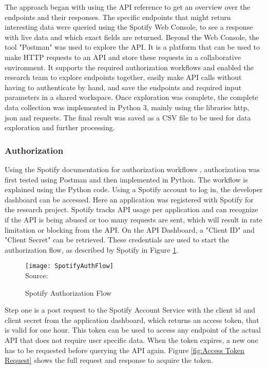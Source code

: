 The approach began with using the \ac{API} reference to get an overview over the endpoints and their responses.
The specific endpoints that might return interesting data were queried using the Spotify Web Console, to see
a response with live data and which exact fields are returned.
Beyond the Web Console, the tool "Postman" was used to explore the \ac{API}.
It is a platform that can be used to make HTTP requests to an API and store these requests in
a collaborative environment. \cite{PostmanWhatIs} It supports the required authorization workflows
and enabled the research team to explore endpoints together, easily make \ac{API} calls without having to
authenticate by hand, and save the endpoints and required input parameters in a shared workspace.
Once exploration was complete, the complete data collection was implemented in Python 3, mainly using the
libraries http, json and requests. The final result was saved as a CSV file to be used for data exploration
and further processing.

\subsubsection{Authorization}

Using the Spotify documentation for authorization workflows \cite{SpotifyAuth}, authorization was first tested
using Postman and then implemented in Python.
The workflow is explained using the Python code.
Using a Spotify account to log in, the developer dashboard can be accessed. Here an application was registered with
Spotify for the research project. Spotify tracks \ac{API} usage per application and can recognize if the API is
being abused or too many requests are sent, which will result in rate limitation or blocking from the \ac{API}.
On the API Dashboard, a "Client ID" and "Client Secret" can be retrieved. These credentials are used to start
the authorization flow, as described by Spotify in Figure \ref{fig:Spotify Authorization Flow}.

\begin{figure}[H]
    \caption{Spotify Authorization Flow}
	\label{fig:Spotify Authorization Flow}
    \texttt{[image: SpotifyAuthFlow]}
    \\
    Source: \cite{SpotifyAuth}
\end{figure}

Step one is a post request to the Spotify Account Service with the client id and client secret from the application dashboard, which returns an
access token, that is valid for one hour. This token can be used to access any endpoint of the actual \ac{API} that
does not require user specific data. When the token expires, a new one has to be requested before querying the \ac{API} again.
Figure \ref{fig:Access Token Request} shows the full request and response to acquire the token.


